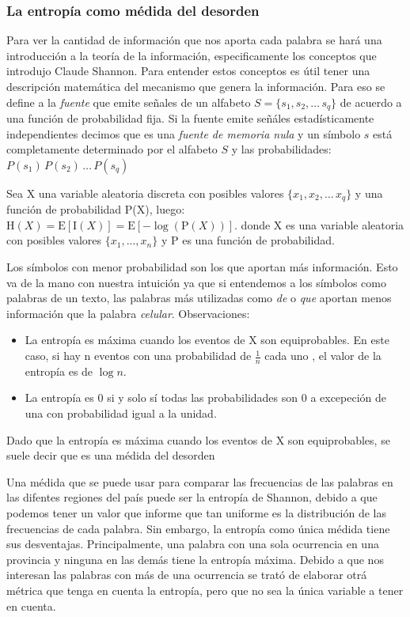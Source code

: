 \subsubsection{La entropía como médida del desorden}

Para ver la cantidad de información que nos aporta cada palabra se hará una introducción a la teoría de la información, especificamente
los conceptos que introdujo Claude Shannon\cite{shannon2001mathematical}.
Para entender estos conceptos es útil tener una descripción matemática del mecanismo que genera la información. Para eso se define a 
la \textit{fuente} que emite señales de un alfabeto $ S = \{s_1, s_2, \dots\, s_q\}$ de acuerdo a una función de probabilidad fija.
Si la fuente emite señáles estadísticamente independientes decimos que es una \textit{fuente de memoria nula} y un símbolo $s$ está completamente determinado por el alfabeto $S$ y las probabilidades:
$P(s_1)\,P(s_2)\, \dots\, P(s_q)$

Sea X una variable aleatoria discreta con posibles valores $\{x_1, x_2, \dots\, x_q\}$ y una función de probabilidad P(X), luego:
${\displaystyle \mathrm {H} (X)=\mathrm {E} [\mathrm {I} (X)]=\mathrm {E} [-\log(\mathrm {P} (X))].}$
donde X es una variable aleatoria con posibles valores $\{x_1, ... , x_n\}$ y P es una función de probabilidad.

Los símbolos con menor probabilidad son los que aportan más información. Esto va de la mano con nuestra intuición ya que si entendemos a los símbolos como palabras de un texto, las palabras más utilizadas como \textit{de} o \textit{que} aportan menos información que la palabra \textit{celular}. 
Observaciones:
\begin{itemize}
    \item La entropía es máxima cuando los eventos de X son equiprobables. En este caso, si hay n eventos con una probabilidad de $\frac{1}{n}$ cada uno , el valor de la entropía es de $\log n$.
    \item La entropía es 0 si y solo sí todas las probabilidades son 0 a excepeción de una con probabilidad igual a la unidad. 
\end{itemize}

Dado que la entropía es máxima cuando los eventos de X son equiprobables, se suele decir que es una médida del desorden

Una médida que se puede usar para comparar las frecuencias de las palabras en las difentes regiones del país puede ser la entropía de Shannon, debido a que podemos tener un valor que informe que tan uniforme es la distribución de las frecuencias de cada palabra.
Sin embargo, la entropía como única médida tiene sus desventajas. Principalmente, una palabra con una sola ocurrencia en una provincia y ninguna en las demás tiene la entropía máxima. Debido a que nos interesan las palabras con más de una ocurrencia se trató de elaborar otrá métrica que tenga en cuenta la entropía, pero que no sea la única variable a tener en cuenta.


